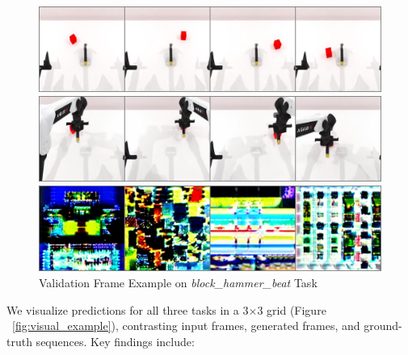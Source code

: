 \begin{figure}[htbp]
    \centering
    \begin{minipage}{0.45\textwidth}
        \centering
        \includegraphics[width=\textwidth]{figs/val_before.png}
    \end{minipage}\hfill
    \begin{minipage}{0.45\textwidth}
        \centering
        \includegraphics[width=\textwidth]{figs/val_before-vq.png}  
    \end{minipage}\hfill
    \begin{minipage}{0.45\textwidth}
        \centering
        \includegraphics[width=\textwidth]{figs/val_after-gen.png}  
    \end{minipage}
    \caption{Validation Frame Example on \textit{block\_hammer\_beat} Task}
    \label{fig:val_example}
\end{figure}

We visualize predictions for all three tasks in a 3$\times$3 grid (Figure ~\ref{fig:visual_example}), 
    contrasting input frames, generated frames, and ground-truth sequences. Key findings include:

